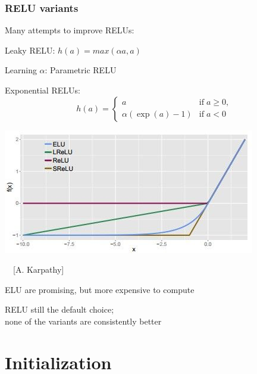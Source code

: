 \documentclass[xcolor=dvipsnames]{beamer}
\begin{document}
\begin{frame}
  \frametitle{RELU variants}
  \bi
\item Many attempts to improve RELUs:
\ei
\begin{minipage}[c]{.55\linewidth}
\bi
\item  Leaky RELU: $h(a)=max(\alpha a, a)$
\item Learning $\alpha$: Parametric RELU
\item Exponential RELUs:
\[h(a)=
  \begin{cases}
    a & \text{if}\;a\ge 0,\\
    \alpha(\exp(a)-1) &\text{if}\;a<0
  \end{cases}
\]
\ei
\end{minipage}%
\begin{minipage}[c]{.45\linewidth}
  \includegraphics[width=.97\textwidth]{ak-activations} 

~~[A. Karpathy]
\end{minipage}

\bi
\item ELU are promising, but more expensive to compute
\item RELU still the default choice;\\
none of the variants are consistently better
\ei
\end{frame}



\section{Initialization}
\end{document}
